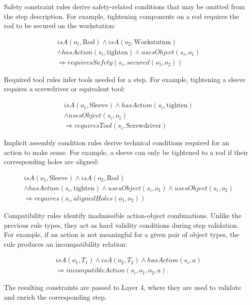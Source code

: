 Safety constraint rules derive safety-related conditions that may be omitted from the step description. For example, tightening components on a rod requires the rod to be secured on the workstation:

\begin{align*}
&isA(o_1,\text{Rod}) \wedge isA(o_2,\text{Workstation}) \\
&\wedge hasAction(s_i,\text{tighten}) \wedge usesObject(s_i,o_1) \\
&\Rightarrow requiresSafety(s_i, secured(o_1,o_2))
\end{align*}

Required tool rules infer tools needed for a step. For example, tightening a sleeve requires a screwdriver or equivalent tool:

\begin{align*}
&isA(o_1,\text{Sleeve}) \wedge hasAction(s_i,\text{tighten})  \\
&\wedge usesObject(s_i,o_1)  \\
&\Rightarrow requiresTool(s_i,\text{Screwdriver})
\end{align*}

Implicit assembly condition rules derive technical conditions required for an action to make sense. For example, a sleeve can only be tightened to a rod if their corresponding holes are aligned:

\begin{align*}
&isA(o_1,\text{Sleeve}) \wedge isA(o_2,\text{Rod})  \\
&\wedge hasAction(s_i,\text{tighten}) \wedge usesObject(s_i,o_1) \wedge usesObject(s_i,o_2) \\
&\Rightarrow requires(s_i, alignedHoles(o_1,o_2))
\end{align*}

Compatibility rules identify inadmissible action-object combinations. Unlike the previous rule types, they act as hard validity conditions during step validation. For example, if an action is not meaningful for a given pair of object types, the rule produces an incompatibility relation:

\begin{align*}
&isA(o_1,T_1) \wedge isA(o_2,T_2) \wedge hasAction(s_i,a) \\
&\Rightarrow incompatibleAction(s_i,o_1,o_2,a).
\end{align*}

The resulting constraints are passed to Layer 4, where they are used to validate and enrich the corresponding step.

